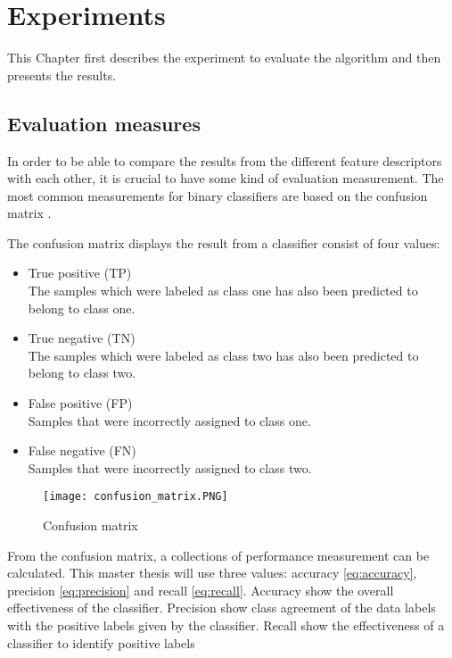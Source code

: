 \chapter{Experiments}\label{cha:result}

This Chapter first describes the experiment to evaluate the algorithm and then presents the results.

\section{Evaluation measures} \label{section:evaluation_measures}

In order to be able to compare the results from the different feature descriptors with each other, it is crucial to have some kind of evaluation measurement. The most common measurements for binary classifiers are based on the confusion matrix \cite{sokolova2009systematic}. 

The confusion matrix displays the result from a classifier consist of four values:

\begin{itemize}
	\item True positive (TP)\\
	The samples which were labeled as class one has also been predicted to belong to class one.
	
	\item True negative (TN)\\
	The samples which were labeled as class two has also been predicted to belong to class two.
	
	\item False positive (FP)\\
	Samples that were incorrectly assigned to class one.
	
	\item False negative (FN)\\
	Samples that were incorrectly assigned to class two.
\end{itemize}

\FloatBarrier
\begin{figure}[!h]
	\centering
	\texttt{[image: confusion\_matrix.PNG]}
	\caption{Confusion matrix
		\label{fig:confusion}}
\end{figure} 
\FloatBarrier

From the confusion matrix, a collections of performance measurement can be calculated. This master thesis will use three values: accuracy \cref{eq:accuracy}, precision \cref{eq:precision} and recall \cref{eq:recall}. Accuracy show the overall effectiveness of the classifier. Precision show class agreement of the data labels with the positive labels given by the classifier. Recall show the effectiveness of a classifier to identify positive labels

